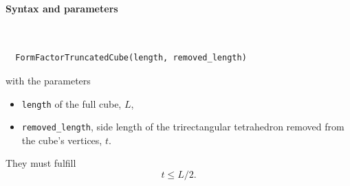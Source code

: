 \paragraph{Syntax and parameters}\strut\\[-2ex plus .2ex minus .2ex]
\begin{lstlisting}
  FormFactorTruncatedCube(length, removed_length)
\end{lstlisting}
with the parameters
\begin{itemize}
\item \texttt{length} of the full cube, $L$,
\item \texttt{removed\_length}, side length of the trirectangular tetrahedron removed from the cube's vertices, $t$.
\end{itemize}
They must fulfill
\begin{displaymath}
  t \le L/2.
\end{displaymath}

